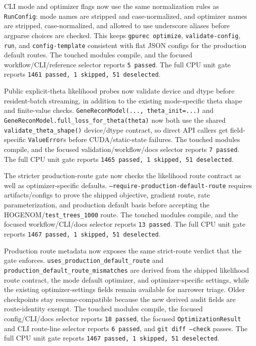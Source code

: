 \documentclass[11pt]{article}
\begin{document}
CLI mode and optimizer flags now use the same normalization rules as
\texttt{RunConfig}: mode names are stripped and case-normalized, and optimizer
names are stripped, case-normalized, and allowed to use underscore aliases
before argparse choices are checked.  This keeps \texttt{gpurec optimize},
\texttt{validate-config}, \texttt{run}, and \texttt{config-template}
consistent with flat JSON configs for the production default routes.  The
touched modules compile, and the focused workflow/CLI/reference selector reports
\texttt{5 passed}.  The full CPU unit gate reports
\texttt{1461 passed, 1 skipped, 51 deselected}.

Public explicit-theta likelihood probes now validate device and dtype before
resident-batch streaming, in addition to the existing mode-specific theta shape
and finite-value checks.  \texttt{GeneReconModel(..., theta\_init=...)} and
\texttt{GeneReconModel.full\_loss\_for\_theta(theta)} now both use the shared
\texttt{validate\_theta\_shape()} device/dtype contract, so direct API callers
get field-specific \texttt{ValueError}s before CUDA/static-state failures.  The
touched modules compile, and the focused validation/workflow/docs selector
reports \texttt{7 passed}.  The full CPU unit gate reports
\texttt{1465 passed, 1 skipped, 51 deselected}.

The stricter production-route gate now checks the likelihood route contract as
well as optimizer-specific defaults.  \texttt{--require-production-default-route}
requires artifacts/configs to prove the shipped objective, gradient route, rate
parameterization, and production default basis before accepting the
HOGENOM/\texttt{test\_trees\_1000} route.  The touched modules compile, and the
focused workflow/CLI/docs selector reports \texttt{13 passed}.  The full CPU
unit gate reports \texttt{1467 passed, 1 skipped, 51 deselected}.

Production route metadata now exposes the same strict-route verdict that the
gate enforces.  \texttt{uses\_production\_default\_route} and
\texttt{production\_default\_route\_mismatches} are derived from the shipped
likelihood route contract, the mode default optimizer, and optimizer-specific
settings, while the existing optimizer-settings fields remain available for
narrower triage.  Older checkpoints stay resume-compatible because the new
derived audit fields are route-identity exempt.  The touched modules compile,
the focused config/CLI/docs selector reports \texttt{18 passed}, the focused
\texttt{OptimizationResult} and CLI route-line selector reports
\texttt{6 passed}, and \texttt{git diff --check} passes.  The full CPU unit
gate reports \texttt{1467 passed, 1 skipped, 51 deselected}.
\end{document}
